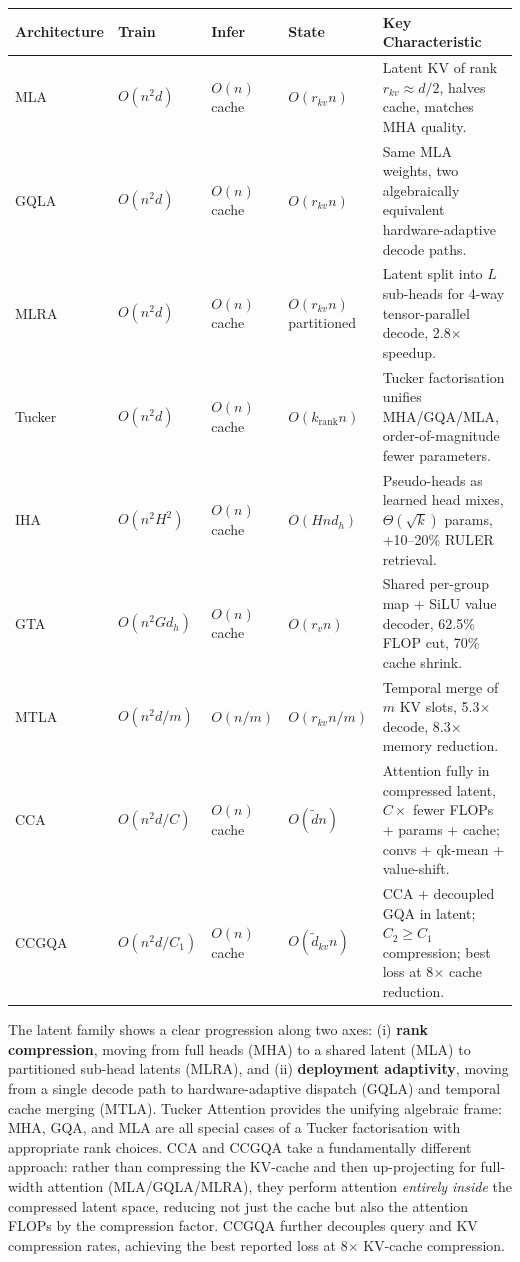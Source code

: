 \small
\begin{longtable}{p{2.0cm}p{1.8cm}p{1.6cm}p{1.6cm}p{4.5cm}}
\toprule
\textbf{Architecture} & \textbf{Train} & \textbf{Infer} & \textbf{State} & \textbf{Key Characteristic} \\
\midrule
\endhead
MLA & $O(n^2 d)$ & $O(n)$ cache & $O(r_{kv} n)$ & Latent KV of rank $r_{kv}\!\approx\!d/2$, halves cache, matches MHA quality. \\
GQLA & $O(n^2 d)$ & $O(n)$ cache & $O(r_{kv} n)$ & Same MLA weights, two algebraically equivalent hardware-adaptive decode paths. \\
MLRA & $O(n^2 d)$ & $O(n)$ cache & $O(r_{kv} n)$ partitioned & Latent split into $L$ sub-heads for 4-way tensor-parallel decode, 2.8$\times$ speedup. \\
Tucker & $O(n^2 d)$ & $O(n)$ cache & $O(k_{\text{rank}} n)$ & Tucker factorisation unifies MHA/GQA/MLA, order-of-magnitude fewer parameters. \\
IHA & $O(n^2 H^2)$ & $O(n)$ cache & $O(H n d_h)$ & Pseudo-heads as learned head mixes, $\Theta(\sqrt{k})$ params, +10--20\% RULER retrieval. \\
GTA & $O(n^2 G d_h)$ & $O(n)$ cache & $O(r_v n)$ & Shared per-group map + SiLU value decoder, 62.5\% FLOP cut, 70\% cache shrink. \\
MTLA & $O(n^2 d / m)$ & $O(n/m)$ & $O(r_{kv} n/m)$ & Temporal merge of $m$ KV slots, 5.3$\times$ decode, 8.3$\times$ memory reduction. \\
CCA & $O(n^2 d / C)$ & $O(n)$ cache & $O(\tilde{d} n)$ & Attention fully in compressed latent, $C{\times}$ fewer FLOPs + params + cache; convs + qk-mean + value-shift. \\
CCGQA & $O(n^2 d / C_1)$ & $O(n)$ cache & $O(\tilde{d}_{kv} n)$ & CCA + decoupled GQA in latent; $C_2 \geq C_1$ compression; best loss at 8$\times$ cache reduction. \\
\bottomrule
\end{longtable}
\normalsize

The latent family shows a clear progression along two axes: (i) \textbf{rank compression}, moving from full heads (MHA) to a shared latent (MLA) to partitioned sub-head latents (MLRA), and (ii) \textbf{deployment adaptivity}, moving from a single decode path to hardware-adaptive dispatch (GQLA) and temporal cache merging (MTLA). Tucker Attention provides the unifying algebraic frame: MHA, GQA, and MLA are all special cases of a Tucker factorisation with appropriate rank choices. CCA and CCGQA take a fundamentally different approach: rather than compressing the KV-cache and then up-projecting for full-width attention (MLA/GQLA/MLRA), they perform attention \emph{entirely inside} the compressed latent space, reducing not just the cache but also the attention FLOPs by the compression factor. CCGQA further decouples query and KV compression rates, achieving the best reported loss at 8$\times$ KV-cache compression.